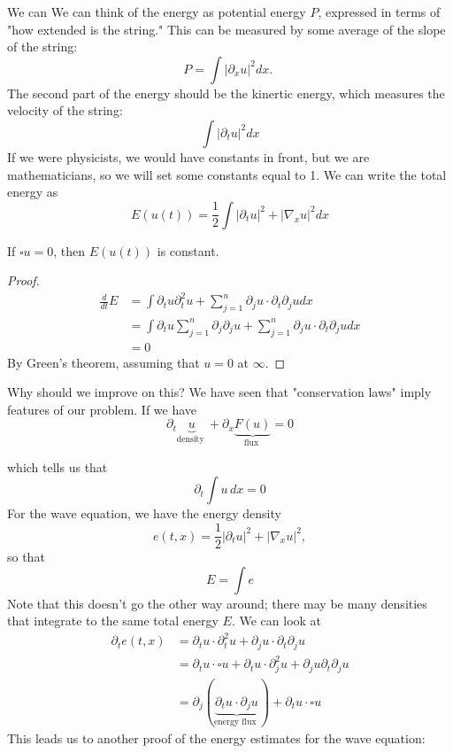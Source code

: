 We can 
We can think of the energy as potential energy $P$, expressed in terms of "how extended is the string." This can be measured by some average of the slope of the string:
$$
P=\int\left|\partial_{x} u\right|^{2} d x \text {. }
$$
The second part of the energy should be the kinertic energy, which measures the velocity of the string:
$$
\int\left|\partial_{t} u\right|^{2} d x
$$
If we were physicists, we would have constants in front, but we are mathematicians, so we will set some constants equal to 1. We can write the total energy as
$$
E(u(t))=\frac{1}{2} \int\left|\partial_{t} u\right|^{2}+\left|\nabla_{x} u\right|^{2} d x
$$

\begin{theorem}
    If $\square u =0$, then $E(u(t))$ is constant.
\end{theorem}

\begin{proof}
\[
    \begin{aligned}
        \frac{d}{d t} E &=\int \partial_{t} u \partial_{t}^{2} u+\sum_{j=1}^{n} \partial_{j} u \cdot \partial_{t} \partial_{j} u d x  \\
        &=\int \partial_{t} u \sum_{j=1}^{n} \partial_{j} \partial_{j} u+\sum_{j=1}^{n} \partial_{j} u \cdot \partial_{t} \partial_{j} u d x  \\
        &=0
        \end{aligned}
\]
 By Green's theorem, assuming that $ u=0 $ at $\infty$.
\end{proof}

Why should we improve on this? We have seen that "conservation laws" imply features of our problem. If we have
$$
\partial_{t} \underbrace{u}_{\text {density }}+\partial_{x} \underbrace{F(u)}_{\text {flux }}=0
$$ 

which tells us that
$$
\partial_{t} \int u \,dx=0
$$
For the wave equation, we have the energy density
$$
e(t, x)=\frac{1}{2}\left|\partial_{t} u\right|^{2}+\left|\nabla_{x} u\right|^{2},
$$
so that
$$
E=\int e
$$
Note that this doesn't go the other way around; there may be many densities that integrate to the same total energy $E$. We can look at
$$
\begin{aligned}
\partial_{t} e(t, x) &=\partial_{t} u \cdot \partial_{t}^{2} u+\partial_{j} u \cdot \partial_{t} \partial_{j} u \\
&=\partial_{t} u \cdot \square u+\partial_{t} u \cdot \partial_{j}^{2} u+\partial_{j} u \partial_{t} \partial_{j} u \\
&=\partial_{j}(\underbrace{\partial_{t} u \cdot \partial_{j} u}_{\text {energy flux }})+\partial_{t} u \cdot \square u
\end{aligned}
$$
This leads us to another proof of the energy estimates for the wave equation:

